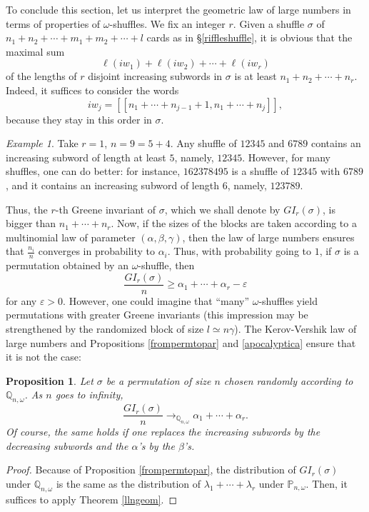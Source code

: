 \documentclass[smallextended,nospthms]{svjour3}
\newtheorem{proposition}[theorem]{Proposition}
\theoremstyle{remark}
\newtheorem*{example}{Example}
\newcommand{\proba}{\mathbb{P}}
\newcommand{\qproba}{\mathbb{Q}}
\newcommand{\eps}{\varepsilon}
\newcommand{\lle}{\left[\!\left[}
\newcommand{\rre}{\right]\!\right]}
\begin{document}
To conclude this section, let us interpret the geometric law of large numbers in terms of properties of $\omega$-shuffles. We fix an integer $r$. Given a shuffle $\sigma$ of $n_{1}+n_{2}+\cdots+m_{1}+m_{2}+\cdots+l$ cards as in \S\ref{riffleshuffle}, it is obvious that the maximal sum 
$$\ell(iw_{1})+\ell(iw_{2})+\cdots+\ell(iw_{r})$$
of the lengths of $r$ disjoint increasing subwords in $\sigma$ is at least $n_{1}+n_{2}+\cdots+n_{r}$. Indeed, it suffices to consider the words 
$$iw_{j}=\lle n_{1}+\cdots+n_{j-1}+1,n_{1}+\cdots+n_{j}\rre,$$
because they stay in this order in $\sigma$. 
\begin{example}
Take $r=1$, $n=9=5+4$. Any shuffle of $12345$ and $6789$ contains an increasing subword of length at least $5$, namely, $12345$. However, for many shuffles, one can do better: for instance, $162378495$ is a shuffle of $12345$ with $6789$, and it contains an increasing subword of length $6$, namely, $123789$.
\end{example}
\noindent Thus, the $r$-th Greene invariant of $\sigma$, which we shall denote by $GI_{r}(\sigma)$, is bigger than $n_{1}+\cdots+n_{r}$. Now, if the sizes of the blocks are taken according to a multinomial law of parameter $(\alpha,\beta,\gamma)$, then the law of large numbers ensures that $\frac{n_{i}}{n}$ converges in probability to $\alpha_{i}$. Thus, with probability going to $1$, if $\sigma$ is a permutation obtained by an $\omega$-shuffle, then
$$\frac{GI_{r}(\sigma)}{n} \geq \alpha_{1}+\cdots + \alpha_{r}-\eps$$
for any $\eps>0$. However, one could imagine that ``many'' $\omega$-shuffles yield permutations with greater Greene invariants (this impression may be strengthened by the randomized block of size $l\simeq n\gamma$). The Kerov-Vershik law of large numbers and Propositions \ref{frompermtopar} and \ref{apocalyptica} ensure that it is not the case:
\begin{proposition}
Let $\sigma$ be a permutation of size $n$ chosen randomly according to $\qproba_{n,\omega}$. As $n$ goes to infinity, 
$$\frac{GI_{r}(\sigma)}{n} \longrightarrow_{\qproba_{n,\omega}} \alpha_{1}+\cdots+\alpha_{r}.$$
Of course, the same holds if one replaces the increasing subwords by the decreasing subwords and the $\alpha$'s by the $\beta$'s.
\end{proposition}
\begin{proof}
Because of Proposition \ref{frompermtopar}, the distribution of $GI_{r}(\sigma)$ under $\qproba_{n,\omega}$ is the same as the distribution of $\lambda_{1}+\cdots+\lambda_{r}$ under $\proba_{n,\omega}$. Then, it suffices to apply Theorem \ref{llngeom}.
\end{proof}\bigskip
\end{document}

